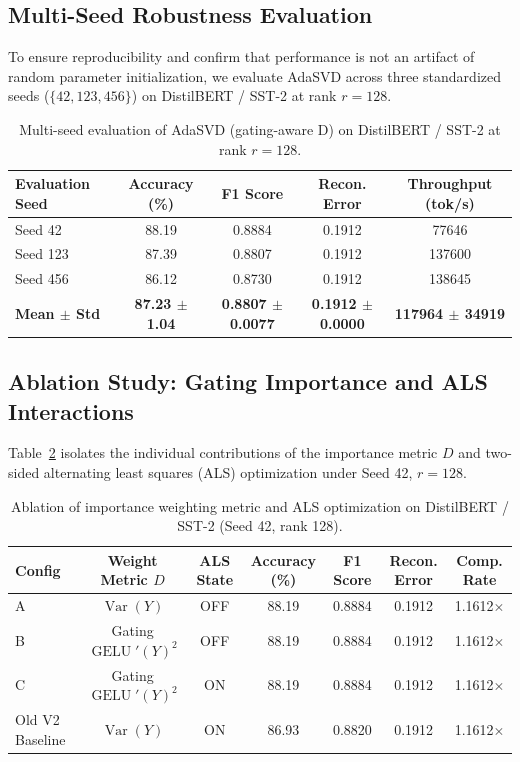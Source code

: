 \documentclass{article}
\begin{document}
\subsection{Multi-Seed Robustness Evaluation}
To ensure reproducibility and confirm that performance is not an artifact of random parameter initialization, we evaluate AdaSVD across three standardized seeds ($\{42, 123, 456\}$) on DistilBERT / SST-2 at rank $r=128$.

\begin{table}[H]
\centering
\small
\begin{tabular}{lcccc}
\toprule
\textbf{Evaluation Seed} & \textbf{Accuracy (\%)} & \textbf{F1 Score} & \textbf{Recon. Error} & \textbf{Throughput (tok/s)} \\
\midrule
Seed 42 & 88.19 & 0.8884 & 0.1912 & 77646 \\
Seed 123 & 87.39 & 0.8807 & 0.1912 & 137600 \\
Seed 456 & 86.12 & 0.8730 & 0.1912 & 138645 \\
\midrule
\textbf{Mean $\pm$ Std} & \textbf{87.23 $\pm$ 1.04} & \textbf{0.8807 $\pm$ 0.0077} & \textbf{0.1912 $\pm$ 0.0000} & \textbf{117964 $\pm$ 34919} \\
\bottomrule
\end{tabular}
\caption{Multi-seed evaluation of AdaSVD (gating-aware D) on DistilBERT / SST-2 at rank $r=128$.}
\label{tab:multiseed_results}
\end{table}

\subsection{Ablation Study: Gating Importance and ALS Interactions}
Table~\ref{tab:ablation_results} isolates the individual contributions of the importance metric $D$ and two-sided alternating least squares (ALS) optimization under Seed 42, $r=128$.

\begin{table}[H]
\centering
\small
\begin{tabular}{lcccccc}
\toprule
\textbf{Config} & \textbf{Weight Metric $D$} & \textbf{ALS State} & \textbf{Accuracy (\%)} & \textbf{F1 Score} & \textbf{Recon. Error} & \textbf{Comp. Rate} \\
\midrule
A & $\operatorname{Var}(Y)$ & OFF & 88.19 & 0.8884 & 0.1912 & 1.1612$\times$ \\
B & Gating $\operatorname{GELU}'(Y)^2$ & OFF & 88.19 & 0.8884 & 0.1912 & 1.1612$\times$ \\
C & Gating $\operatorname{GELU}'(Y)^2$ & ON & 88.19 & 0.8884 & 0.1912 & 1.1612$\times$ \\
Old V2 Baseline & $\operatorname{Var}(Y)$ & ON & 86.93 & 0.8820 & 0.1912 & 1.1612$\times$ \\
\bottomrule
\end{tabular}
\caption{Ablation of importance weighting metric and ALS optimization on DistilBERT / SST-2 (Seed 42, rank 128).}
\label{tab:ablation_results}
\end{table}
\end{document}
